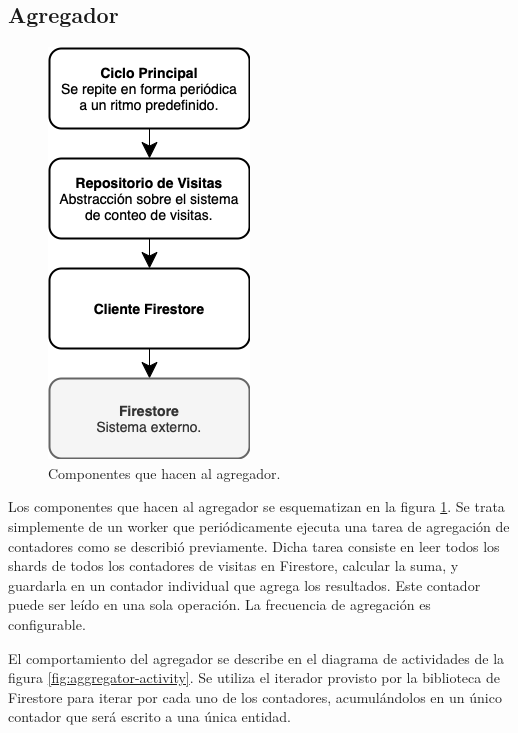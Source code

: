 \documentclass[11pt]{scrartcl}
\begin{document}
\subsection{Agregador}

\begin{figure}
\begin{center}
\includegraphics[scale=0.7]{img/aggregator}
\end{center}
\caption{Componentes que hacen al agregador.}
\label{fig:aggregator}
\end{figure}

Los componentes que hacen al agregador se esquematizan en la figura \ref{fig:aggregator}. Se trata simplemente de un worker que periódicamente ejecuta una tarea de agregación de contadores como se describió previamente. Dicha tarea consiste en leer todos los shards de todos los contadores de visitas en Firestore, calcular la suma, y guardarla en un contador individual que agrega los resultados. Este contador puede ser leído en una sola operación. La frecuencia de agregación es configurable.

El comportamiento del agregador se describe en el diagrama de actividades de la figura \ref{fig:aggregator-activity}. Se utiliza el iterador provisto por la biblioteca de Firestore para iterar por cada uno de los contadores, acumulándolos en un único contador que será escrito a una única entidad.
\end{document}
